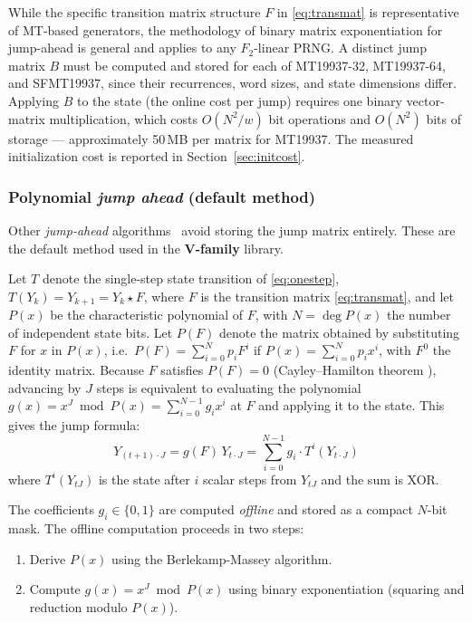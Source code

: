 \documentclass[preprint,1p,times]{elsarticle}
\begin{document}
While the specific transition matrix structure $F$ in \eqref{eq:transmat} is representative of MT-based generators, the methodology of binary matrix exponentiation for jump-ahead is general and applies to any $F_2$-linear PRNG. A distinct jump matrix $B$ must be computed and stored for each of MT19937-32, MT19937-64, and SFMT19937, since their recurrences, word sizes, and state dimensions differ. Applying $B$ to the state (the online cost per jump) requires one binary vector-matrix multiplication, which costs $O(N^2/w)$ bit operations and $O(N^2)$ bits of storage — approximately 50\,MB per matrix for MT19937. The measured initialization cost is reported in Section~\ref{sec:initcost}.

\subsubsection{Polynomial \textit{jump ahead} (default method)}
\label{sec:polyjump}
Other \textit{jump-ahead} algorithms~\cite{jump1,jump2} avoid storing the jump matrix entirely. These are the default method used in the \textbf{V-family} library.

Let $T$ denote the single-step state transition of \eqref{eq:onestep}, $T(Y_k) = Y_{k+1} = Y_k \star F$, where $F$ is the transition matrix \eqref{eq:transmat}, and let $P(x)$ be the characteristic polynomial of $F$, with $N = \deg P(x)$ the number of independent state bits. Let $P(F)$ denote the matrix obtained by substituting $F$ for $x$ in $P(x)$, i.e.\ $P(F) = \sum_{i=0}^{N} p_i F^i$ if $P(x) = \sum_{i=0}^{N} p_i x^i$, with $F^0$ the identity matrix. Because $F$ satisfies $P(F) = 0$ (Cayley--Hamilton theorem \cite{lang}), advancing by $J$ steps is equivalent to evaluating the polynomial $g(x) = x^J \bmod P(x) = \sum_{i=0}^{N-1} g_i x^i$ at $F$ and applying it to the state. This gives the jump formula:
\begin{equation}
\label{eq:polyjump}
Y_{(t+1)\cdot J} = g(F)\,Y_{t\cdot J} = \sum_{i=0}^{N-1} g_i \cdot T^i(Y_{t\cdot J})
\end{equation}
where $T^i(Y_{tJ})$ is the state after $i$ scalar steps from $Y_{tJ}$ and the sum is XOR.

The coefficients $g_i \in \{0,1\}$ are computed \emph{offline} and stored as a compact $N$-bit mask. The offline computation proceeds in two steps:
\begin{enumerate}
    \item Derive $P(x)$ using the Berlekamp-Massey algorithm.
    \item Compute $g(x) = x^J \bmod P(x)$ using binary exponentiation (squaring and reduction modulo $P(x)$).
\end{enumerate}
\end{document}
